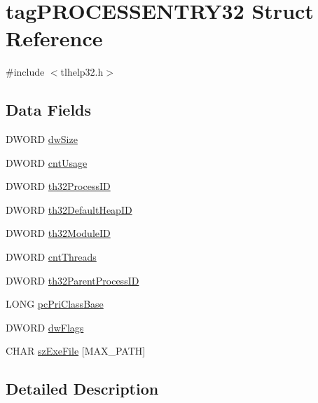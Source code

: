 \hypertarget{structtag_p_r_o_c_e_s_s_e_n_t_r_y32}{}\section{tag\+P\+R\+O\+C\+E\+S\+S\+E\+N\+T\+R\+Y32 Struct Reference}
\label{structtag_p_r_o_c_e_s_s_e_n_t_r_y32}


{\ttfamily \#include $<$tlhelp32.\+h$>$}

\subsection*{Data Fields}
\begin{DoxyCompactItemize}
\item 
D\+W\+O\+RD \hyperlink{structtag_p_r_o_c_e_s_s_e_n_t_r_y32_a669c5a85f5a9eb97e64ad880fadaaa2d}{dw\+Size}
\item 
D\+W\+O\+RD \hyperlink{structtag_p_r_o_c_e_s_s_e_n_t_r_y32_afd2d83c13a1e2ecb9f4878cd7a6d67bd}{cnt\+Usage}
\item 
D\+W\+O\+RD \hyperlink{structtag_p_r_o_c_e_s_s_e_n_t_r_y32_a4e94a85eb6671f7346bc1fb284f56186}{th32\+Process\+ID}
\item 
D\+W\+O\+RD \hyperlink{structtag_p_r_o_c_e_s_s_e_n_t_r_y32_af4b7c2295d859a589e5b20bc6241fc9e}{th32\+Default\+Heap\+ID}
\item 
D\+W\+O\+RD \hyperlink{structtag_p_r_o_c_e_s_s_e_n_t_r_y32_ac028c0e590bc5c6303111ccf82c25517}{th32\+Module\+ID}
\item 
D\+W\+O\+RD \hyperlink{structtag_p_r_o_c_e_s_s_e_n_t_r_y32_a916a91427773137e28e849e42e1737d7}{cnt\+Threads}
\item 
D\+W\+O\+RD \hyperlink{structtag_p_r_o_c_e_s_s_e_n_t_r_y32_afdd365893a3a70e962bd14106ca6906a}{th32\+Parent\+Process\+ID}
\item 
L\+O\+NG \hyperlink{structtag_p_r_o_c_e_s_s_e_n_t_r_y32_ad1c5175f80223fbd2dc54b134569ba4d}{pc\+Pri\+Class\+Base}
\item 
D\+W\+O\+RD \hyperlink{structtag_p_r_o_c_e_s_s_e_n_t_r_y32_a4d2f405b1141000eb2af256e0fc8b98b}{dw\+Flags}
\item 
C\+H\+AR \hyperlink{structtag_p_r_o_c_e_s_s_e_n_t_r_y32_ab45f9004418e1d09cdffce8e17e597a3}{sz\+Exe\+File} \mbox{[}M\+A\+X\+\_\+\+P\+A\+TH\mbox{]}
\end{DoxyCompactItemize}


\subsection{Detailed Description}


